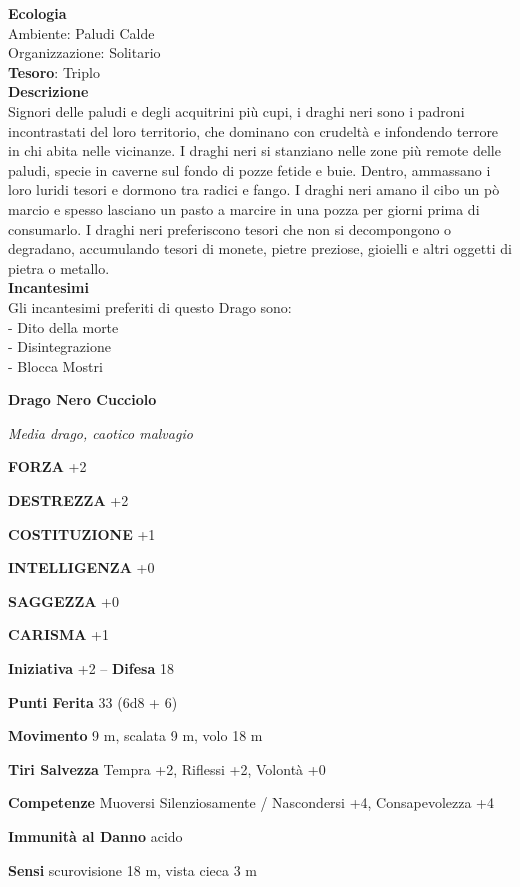 \begin{multicols}{2}
\textbf{Ecologia}\\
Ambiente: Paludi Calde\\
Organizzazione: Solitario\\
\textbf{Tesoro}: Triplo\\
\textbf{Descrizione}\\
Signori delle paludi e degli acquitrini più cupi, i draghi neri sono i padroni incontrastati del loro territorio, che dominano con crudeltà e infondendo terrore in chi abita nelle vicinanze. I draghi neri si stanziano nelle zone più remote delle paludi, specie in caverne sul fondo di pozze fetide e buie. Dentro, ammassano i loro luridi tesori e dormono tra radici e fango. I draghi neri amano il cibo un pò marcio e spesso lasciano un pasto a marcire in una pozza per giorni prima di consumarlo. I draghi neri preferiscono tesori che non si decompongono o degradano, accumulando tesori di monete, pietre preziose, gioielli e altri oggetti di pietra o metallo.\\
\textbf{Incantesimi}\\
Gli incantesimi preferiti di questo Drago sono:\\
- Dito della morte\\
- Disintegrazione\\
- Blocca Mostri


\medskip{}\textbf{Drago Nero Cucciolo}

\textit{Media drago, caotico malvagio}

\textbf{FORZA} +2

\textbf{DESTREZZA} +2

\textbf{COSTITUZIONE} +1

\textbf{INTELLIGENZA} +0

\textbf{SAGGEZZA} +0

\textbf{CARISMA} +1

\textbf{Iniziativa} +2 -- \textbf{Difesa} 18

\textbf{Punti Ferita} 33 (6d8 + 6)

\textbf{Movimento} 9 m, scalata 9 m, volo 18 m

\textbf{Tiri Salvezza} Tempra +2, Riflessi +2, Volontà +0

\textbf{Competenze} Muoversi Silenziosamente / Nascondersi +4, Consapevolezza +4

\textbf{Immunità al Danno} acido

\textbf{Sensi} scurovisione 18 m, vista cieca 3 m


\end{multicols}
